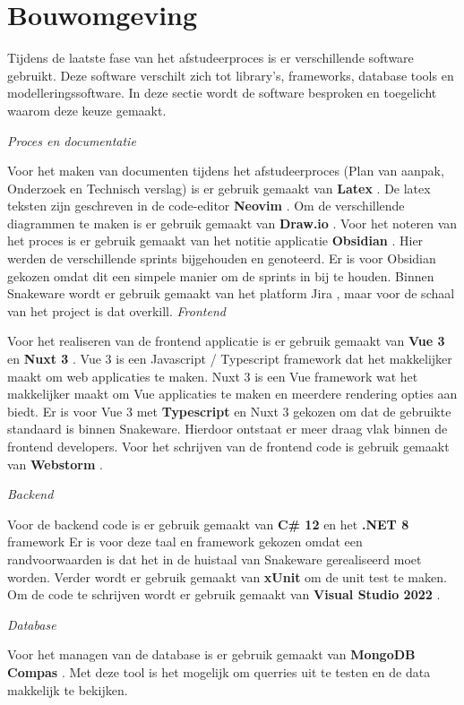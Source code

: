 \section{Bouwomgeving}
Tijdens de laatste fase van het afstudeerproces is er verschillende software gebruikt.
Deze software verschilt zich tot library's, frameworks, database tools en modelleringssoftware.
In deze sectie wordt de software besproken en toegelicht waarom deze keuze gemaakt.

\whitespace[2]
\textit{Proces en documentatie}

\whitespace[2]
Voor het maken van documenten tijdens het afstudeerproces (Plan van aanpak, Onderzoek en Technisch verslag) is er gebruik gemaakt van \textbf{Latex} \parencite{Latex}.
De latex teksten zijn geschreven in de code-editor \textbf{Neovim} \parencite{NeoVim}.
Om de verschillende diagrammen te maken is er gebruik gemaakt van \textbf{Draw.io} \parencite{Drawio}.
Voor het noteren van het proces is er gebruik gemaakt van het notitie applicatie \textbf{Obsidian} \parencite{Obsidian}.
Hier werden de verschillende sprints bijgehouden en genoteerd.
Er is voor Obsidian gekozen omdat dit een simpele manier om de sprints in bij te houden.
Binnen Snakeware wordt er gebruik gemaakt van het platform Jira \parencite{Jira}, maar voor de schaal van het project is dat overkill.
\whitespace[2]
\textit{Frontend}

\whitespace[2]
Voor het realiseren van de frontend applicatie is er gebruik gemaakt van \textbf{Vue 3} \parencite{Vue} en \textbf{Nuxt 3} \parencite{Nuxt}.
Vue 3 is een Javascript \parencite{JavaScript} / Typescript \parencite{Typescript} framework dat het makkelijker maakt om web applicaties te maken.
Nuxt 3 is een Vue framework wat het makkelijker maakt om Vue applicaties te maken en meerdere rendering opties aan biedt.
Er is voor Vue 3 met \textbf{Typescript} en Nuxt 3 gekozen om dat de gebruikte standaard is binnen Snakeware.
Hierdoor ontstaat er meer draag vlak binnen de frontend developers.
Voor het schrijven van de frontend code is gebruik gemaakt van \textbf{Webstorm} \parencite{Webstorm}.

\whitespace[2]
\textit{Backend}

\whitespace[2]
Voor de backend code is er gebruik gemaakt van \textbf{C\# 12} \parencite{CSharp} en het \textbf{.NET 8} framework \parencite{DotNet8}
Er is voor deze taal en framework gekozen omdat een  randvoorwaarden is dat het in de huistaal van Snakeware gerealiseerd moet worden.
Verder wordt er gebruik gemaakt van \textbf{xUnit} \parencite{xUnit} om de unit test te maken.
Om de code te schrijven wordt er gebruik gemaakt van \textbf{Visual Studio 2022} \parencite{VisualStudio}.

\whitespace[2]
\textit{Database}

\whitespace[2]
Voor het managen van de database is er gebruik gemaakt van \textbf{MongoDB Compas} \parencite{MongoDBCompas}.
Met deze tool is het mogelijk om querries uit te testen en de data makkelijk te bekijken.
